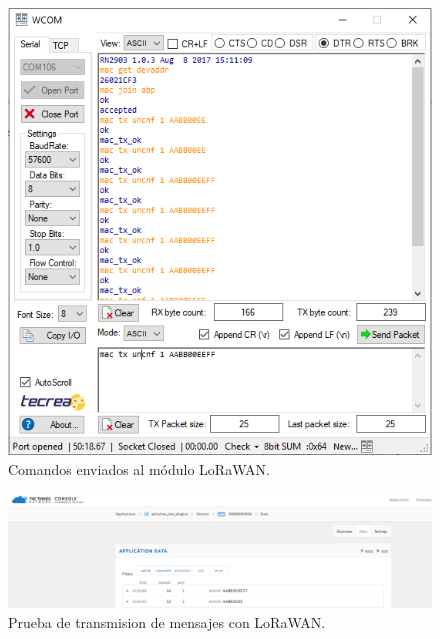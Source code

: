 \begin{figure}[H]
	\centering
	\includegraphics[scale=.45]{./Figures/ComandMacLora.PNG}
	\caption{Comandos enviados al módulo LoRaWAN.}
	\label{fig:ComandMacLora}
\end{figure}
\begin{figure}[H]
	\centering
	\includegraphics[scale=.35]{./Figures/Datalorawantest.PNG}
	\caption{Prueba de transmision de mensajes con LoRaWAN.}
	\label{fig:Datalorawantest}
\end{figure}


